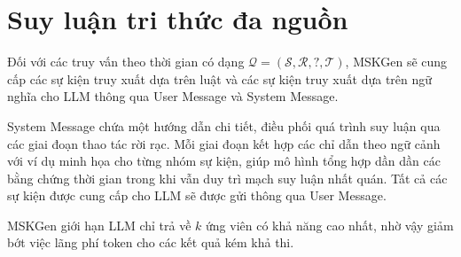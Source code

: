 \vspace{1em}
\section{Suy luận tri thức đa nguồn}
Đối với các truy vấn theo thời gian có dạng $\mathcal{Q = (S, R, ?, T)}$, MSKGen sẽ cung cấp các sự kiện truy xuất dựa trên luật và các sự kiện truy xuất dựa trên ngữ nghĩa cho LLM thông qua User Message và System Message.

System Message chứa một hướng dẫn chi tiết, điều phối quá trình suy luận qua các giai đoạn thao tác rời rạc. Mỗi giai đoạn kết hợp các chỉ dẫn theo ngữ cảnh với ví dụ minh họa cho từng nhóm sự kiện, giúp mô hình tổng hợp dần dần các bằng chứng thời gian trong khi vẫn duy trì mạch suy luận nhất quán. Tất cả các sự kiện được cung cấp cho LLM sẽ được gửi thông qua User Message.

MSKGen giới hạn LLM chỉ trả về $k$ ứng viên có khả năng cao nhất, nhờ vậy giảm bớt việc lãng phí token cho các kết quả kém khả thi.

